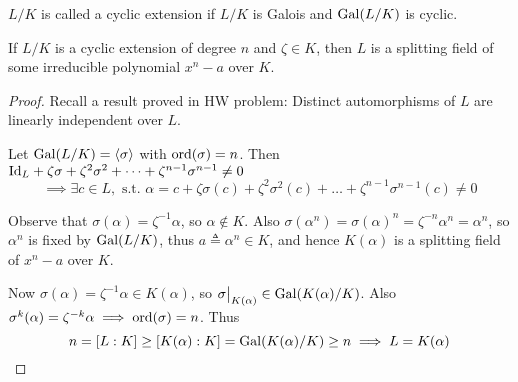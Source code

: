 \begin{definition}
  $L/K$ is called a cyclic extension if $L/K$ is Galois and $\operatorname{Gal}(L/K)$ is cyclic.
\end{definition}

\begin{theorem} \label{thm:kummer-base-theorem}
  If $L/K$ is a cyclic extension of degree $n$ and $\zeta \in K$, then $L$ is a splitting field of
  some irreducible polynomial $x^n - a$ over $K$.

  \begin{proof}
    Recall a result proved in HW problem: Distinct automorphisms of $L$ are linearly independent over $L$.
    
    Let $\operatorname{Gal}(L/K) = \langle\sigma\rangle$ with $\operatorname{ord}(\sigma) = n$. Then
    ${\rm Id}_L + \zeta \sigma + \zeta^2 \sigma^2 + \dots + \zeta^{n-1} \sigma^{n-1} \neq 0$
    \[ \implies \exists c \in L, \text{ s.t. } \alpha = c + \zeta \sigma(c) + \zeta^2 \sigma^2(c)
    + \dots + \zeta^{n-1} \sigma^{n-1}(c) \neq 0 \]

    Observe that $\sigma(\alpha) = \zeta^{-1} \alpha$, so $\alpha \notin K$. Also $\sigma(\alpha^n)
    = \sigma(\alpha)^n = \zeta^{-n}\alpha^n = \alpha^n$, so $\alpha^n$ is fixed by
    $\operatorname{Gal}(L/K)$, thus $a \triangleq \alpha^n \in K$, and hence $K(\alpha)$
    is a splitting field of $x^n - a$ over $K$.

    Now $\sigma(\alpha) = \zeta^{-1}\alpha \in K(\alpha)$, so $\sigma\big|_{K(\alpha)} \in \operatorname{Gal}(K(\alpha) / K)$.
    Also $\sigma^k(\alpha) = \zeta^{-k} \alpha \implies \operatorname{ord}(\sigma) = n$.
    Thus
    \[
      n = [L: K] \geq [K(\alpha): K] = \operatorname{Gal}(K(\alpha) / K) \geq n \implies L = K(\alpha)
      \qedhere
    \]
  \end{proof}
\end{theorem}

